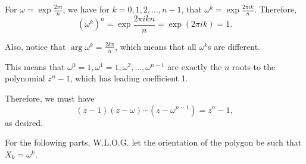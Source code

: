 \Question{\currfilebase}

For \(\omega = \exp \frac{2 \pi i}{n}\), we have for \(k = 0, 1, 2, \ldots, n - 1\), that \(\omega^k = \exp \frac{2\pi i k}{n}\). Therefore,
\[
    (\omega^k)^n = \exp \frac{2\pi i k n}{n} = \exp (2\pi i k) = 1.
\]

Also, notice that \(\arg \omega^k = \frac{2k\pi}{n}\), which means that all \(\omega^k\)s are different.

This means that \(\omega^0 = 1, \omega^1 = 1, \omega^2, \ldots, \omega^{n - 1}\) are exactly the \(n\) roots to the polynomial \(z^n - 1\), which has leading coefficient 1.

Therefore, we must have
\[
    (z - 1)(z - \omega) \cdots (z - \omega^{n - 1}) = z^n - 1,
\]
as desired.

For the following parts, W.L.O.G. let the orientation of the polygon be such that \(X_k = \omega^k\).


